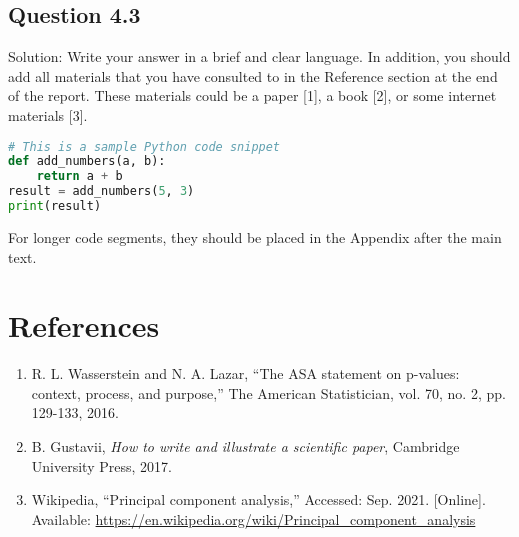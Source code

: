 \documentclass[12pt]{article}
\begin{document}
\subsection{Question 4.3}
Solution: Write your answer in a brief and clear language. In addition, you should add all materials that you have consulted to in the Reference section at the end of the report. These materials could be a paper [1], a book [2], or some internet materials [3].

\newpage

\begin{center}
\begin{lstlisting}[language=Python]
# This is a sample Python code snippet
def add_numbers(a, b):
    return a + b
result = add_numbers(5, 3)
print(result)
\end{lstlisting}
\end{center}

For longer code segments, they should be placed in the Appendix after the main text.

\section*{References}

\begin{enumerate}
    \item R. L. Wasserstein and N. A. Lazar, “The ASA statement on p-values: context, process, and purpose,” The American Statistician, vol. 70, no. 2, pp. 129-133, 2016.
    \item B. Gustavii, \textit{How to write and illustrate a scientific paper}, Cambridge University Press, 2017.
    \item Wikipedia, “Principal component analysis,” Accessed: Sep. 2021. [Online]. Available: \url{https://en.wikipedia.org/wiki/Principal_component_analysis}
\end{enumerate}
\end{document}
